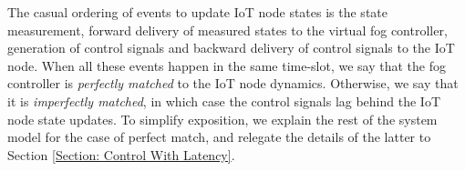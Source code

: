\documentclass[10pt, journal, letterpaper]{IEEEtran}
\newcommand{\1}{\ensuremath{\mathbf{1}}} %
\renewcommand{\vec}[1]{\ensuremath{\boldsymbol{#1}}} %
\begin{document}
The casual ordering of events to update IoT node states is the state measurement, forward delivery of measured states to the virtual fog controller, generation of control signals and backward delivery of control signals to the IoT node. %
When all these events happen in the same time-slot, we say that the fog controller is {\em perfectly matched} to the IoT node dynamics.  Otherwise, we say that it is {\em imperfectly matched}, in which case the control signals lag behind the IoT node state updates. To simplify exposition, we explain the rest of the system model for the case of perfect match, and relegate the details of the latter to Section \ref{Section: Control With Latency}.
\end{document}
